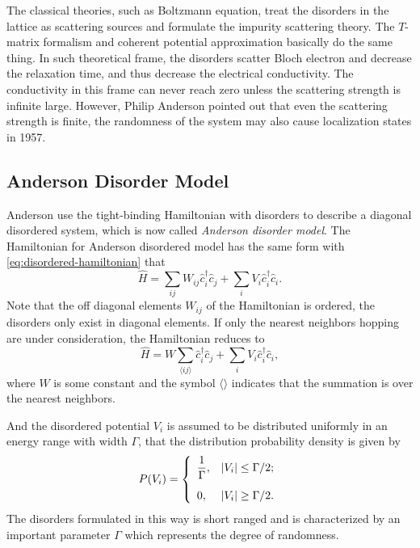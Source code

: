 \documentclass{book}
\newcommand{\average}[1]{\langle#1\rangle}
\numberwithin{equation}{section}
\begin{document}
The classical theories, such as Boltzmann equation, treat the
disorders in the lattice as scattering sources and formulate the
impurity scattering theory. The $T$-matrix formalism and coherent
potential approximation basically do the same thing. In such
theoretical frame, the disorders scatter Bloch electron and decrease
the relaxation time, and thus decrease the electrical
conductivity. The conductivity in this frame can never reach zero
unless the scattering strength is infinite large. However, Philip
Anderson pointed out that even the scattering strength is finite, the
randomness of the system may also cause localization states in 1957.

\subsection*{Anderson Disorder Model}
Anderson use the tight-binding Hamiltonian with disorders to describe
a diagonal disordered system, which is now called \textit{Anderson
  disorder model}. The Hamiltonian for Anderson disordered model has
the same form with \eqref{eq:disordered-hamiltonian} that
\begin{equation}
  \hat{H}=\sum_{ij}W_{ij}\hat{c}^\dag_i\hat{c}_j
  +\sum_{i}V_i\hat{c}^\dagger_i\hat{c}_i.
\end{equation}
Note that the off diagonal elements $W_{ij}$ of the Hamiltonian is
ordered, the disorders only exist in diagonal elements. If only the
nearest neighbors hopping are under consideration, the Hamiltonian
reduces to
\begin{equation}
  \hat{H}=W\!\!\sum_{\average{ij}}\hat{c}^\dag_i\hat{c}_j
  +\sum_{i}V_i\hat{c}^\dagger_i\hat{c}_i,
\end{equation}
where $W$ is some constant and the symbol $\average{}$ indicates that
the summation is over the nearest neighbors.

And the disordered potential $V_i$ is assumed to be distributed
uniformly in an energy range with width $\Gamma$, that the
distribution probability density is given by
\begin{equation}
  \label{eq:anderson-distribution}
  P(V_i)=\left\{\begin{array}{ll}
      \displaystyle\frac{1}{\Gamma}, & 
      \displaystyle|V_i|\le\Gamma/2;\\\vbox to 18pt{}
      0, & \displaystyle|V_i|\ge\Gamma/2.\\
    \end{array}\right.
\end{equation}
The disorders formulated in this way is short ranged and is
characterized by an important parameter $\Gamma$ which represents the
degree of randomness.
\end{document}
